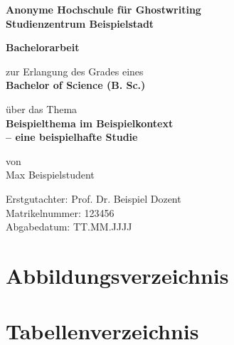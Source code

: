 \documentclass[12pt, a4paper, oneside]{article}
\begin{document}
	
	\begin{titlepage}
		\centering
		
		\textbf{Anonyme Hochschule für Ghostwriting}\\
		\textbf{Studienzentrum Beispielstadt}\vspace{2cm}
		
		\textbf{\LARGE Bachelorarbeit}\vspace{1.5cm}
		
		zur Erlangung des Grades eines\\
		\textbf{Bachelor of Science (B. Sc.)}\vspace{1.5cm}
		
		über das Thema\\
		\textbf{\LARGE Beispielthema im Beispielkontext}\\
		\textbf{\LARGE – eine beispielhafte Studie}\vspace{1.5cm}
		
		von\\
		Max Beispielstudent\vspace{2cm}
		
		\begin{flushleft}
			Erstgutachter: \hspace{0.3cm} Prof. Dr. Beispiel Dozent\\
			Matrikelnummer: \hspace{0.3cm} 123456\\
			Abgabedatum: \hspace{0.3cm} TT.MM.JJJJ
		\end{flushleft}
	\end{titlepage}
	\newpage  %
	
	\begin{spacing}{1}
		\tableofcontents
		\newpage
	\end{spacing}
	
	\section*{Abbildungsverzeichnis}
	\listoffigures
	\newpage
	
	\section*{Tabellenverzeichnis}
	\listoftables
	\newpage
	
\end{document}
